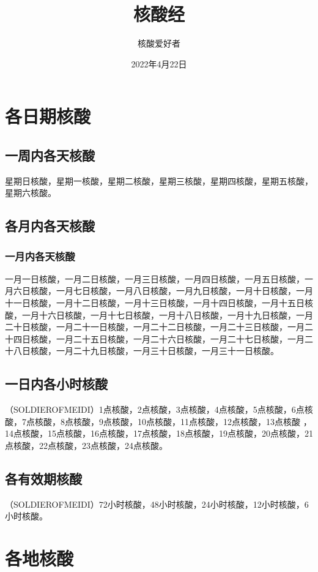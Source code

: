 \documentclass{ctexbook}
\title{核酸经}
\author{核酸爱好者}
\date{2022年4月22日}
\begin{document}
\maketitle

\tableofcontents

\chapter{各日期核酸}

\section{一周内各天核酸}
星期日核酸，星期一核酸，星期二核酸，星期三核酸，星期四核酸，星期五核酸，星期六核酸。

\section{各月内各天核酸}

\subsection{一月内各天核酸}
一月一日核酸，一月二日核酸，一月三日核酸，一月四日核酸，一月五日核酸，一月六日核酸，一月七日核酸，一月八日核酸，一月九日核酸，一月十日核酸，一月十一日核酸，一月十二日核酸，一月十三日核酸，一月十四日核酸，一月十五日核酸，一月十六日核酸，一月十七日核酸，一月十八日核酸，一月十九日核酸，一月二十日核酸，一月二十一日核酸，一月二十二日核酸，一月二十三日核酸，一月二十四日核酸，一月二十五日核酸，一月二十六日核酸，一月二十七日核酸，一月二十八日核酸，一月二十九日核酸，一月三十日核酸，一月三十一日核酸。

\section{一日内各小时核酸}
（SOLDIEROFMEIDI）1点核酸，2点核酸，3点核酸，4点核酸，5点核酸，6点核酸，7点核酸，8点核酸，9点核酸，10点核酸，11点核酸，12点核酸，13点核酸 ，14点核酸，15点核酸，16点核酸，17点核酸，18点核酸，19点核酸，20点核酸，21点核酸，22点核酸，23点核酸，24点核酸。

\section{各有效期核酸}
（SOLDIEROFMEIDI）72小时核酸，48小时核酸，24小时核酸，12小时核酸，6小时核酸。

\chapter{各地核酸}
\end{document}
